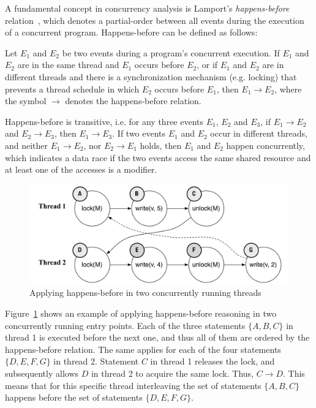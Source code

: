 
A fundamental concept in concurrency analysis is Lamport's \emph{happens-before} relation~\cite{lamport1978time}, which denotes a partial-order between all events during the execution of a concurrent program. Happens-before can be defined as follows:

\begin{definition}
\label{definition:datarace}
Let $E_1$ and $E_2$ be two events during a program's concurrent execution. If $E_1$ and $E_2$ are in the same thread and $E_1$ occurs before $E_2$, or if $E_1$ and $E_2$ are in different threads and there is a synchronization mechanism (e.g. locking) that prevents a thread schedule in which $E_2$ occurs before $E_1$, then $E_1 \rightarrow E_2$, where the symbol $\rightarrow$ denotes the happens-before relation.
\end{definition}

Happens-before is transitive, i.e. for any three events $E_1$, $E_2$ and $E_3$, if $E_1 \rightarrow E_2$ and $E_2 \rightarrow E_3$, then $E_1 \rightarrow E_3$. If two events $E_1$ and $E_2$ occur in different threads, and neither $E_1 \rightarrow E_2$, nor $E_2 \rightarrow E_1$ holds, then $E_1$ and $E_2$ happen concurrently, which indicates a data race if the two events access the same shared resource and at least one of the accesses is a modifier.

\begin{figure}[htbp]
\centering
\includegraphics[width=1\linewidth]{img/happens_before.pdf}
\caption{Applying happens-before in two concurrently running threads}
\label{fig:happens_before}
\end{figure}

Figure~\ref{fig:happens_before} shows an example of applying happens-before reasoning in two concurrently running entry points. Each of the three statements $\{A, B, C\}$ in thread 1 is executed before the next one, and thus all of them are ordered by the happens-before relation. The same applies for each of the four statements $\{D, E, F, G\}$ in thread 2. Statement $C$ in thread 1 releases the lock, and subsequently allows $D$ in thread 2 to acquire the same lock. Thus, $C \rightarrow D$. This means that for this specific thread interleaving the set of statements $\{A, B, C\}$ happens before the set of statements $\{D, E, F, G\}$.

